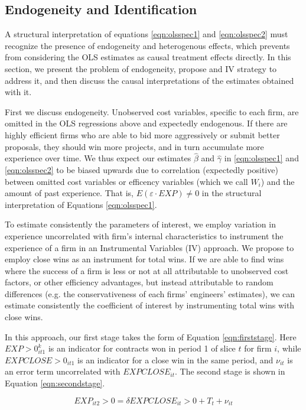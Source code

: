 \subsection{Endogeneity and Identification}
A structural interpretation of equations \ref{eqn:olsspec1} and \ref{eqn:olsspec2} must recognize the presence of endogeneity and heterogenous effects, which prevents from considering the OLS estimates as causal treatment effects directly. In this section, we present the problem of endogeneity, propose and IV strategy to address it, and then discuss the causal interpretations of the estimates obtained with it.

First we discuss endogeneity. Unobserved cost variables, specific to each firm, are omitted in the OLS regressions above and expectedly endogenous. If there are highly efficient firms who are able to bid more aggressively or submit better proposals, they should win more projects, and in turn accumulate more experience over time. We thus expect our estimates $\hat{\beta}$ and $\hat{\gamma}$ in \ref{eqn:olsspec1} and \ref{eqn:olsspec2} to be biased upwards due to correlation (expectedly positive) between omitted cost variables or efficency variables (which we call $W_i$) and the amount of past experience. That is, $E(\varepsilon \cdot EXP)\neq 0$ in the structural interpretation of Equations \ref{eqn:olsspec1}.

To estimate consistently the parameters of interest, we employ variation in experience uncorrelated with firm's internal characteristics to instrument the experience of a firm in an Instrumental Variables (IV) approach. We propose to employ close wins as an instrument for total wins. If we are able to find wins where the success of a firm is less or not at all attributable to unobserved cost factors, or other efficiency advantages, but instead attributable to random differences (e.g. the conservativeness of each firms' engineers' estimates), we can estimate consistently the coefficient of interest by instrumenting total wins with close wins.

In this approach, our first stage takes the form of Equation \ref{eqn:firststage}. Here $EXP>0_{it1}^k$ is an indicator for contracts won in period 1 of slice $t$ for firm $i$, while $EXPCLOSE>0_{it1}$ is an indicator for a close win in the same period, and $\nu_{it}$ is an error term uncorrelated with $EXPCLOSE_{it}$. The second stage is shown in Equation \ref{eqn:secondstage}.

\begin{equation}
\label{eqn:firststage}
EXP_{it2}>0= \delta EXPCLOSE_{it}>0+T_t+\nu_{it}
\end{equation}

